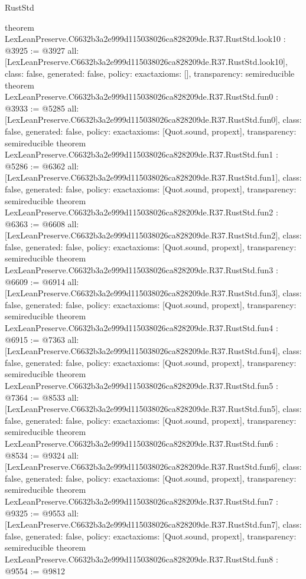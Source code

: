 \begin{lexlean}{RustStd}
\begin{coremodule}
{}
theorem LexLeanPreserve.C6632b3a2e999d115038026ca828209de.R37.RustStd.look10 : @3925 := @3927 {
  all: [LexLeanPreserve.C6632b3a2e999d115038026ca828209de.R37.RustStd.look10],
  class: false,
  generated: false,
  policy: exact{axioms: []},
  transparency: semireducible
}
theorem LexLeanPreserve.C6632b3a2e999d115038026ca828209de.R37.RustStd.fun0 : @3933 := @5285 {
  all: [LexLeanPreserve.C6632b3a2e999d115038026ca828209de.R37.RustStd.fun0],
  class: false,
  generated: false,
  policy: exact{axioms: [Quot.sound, propext]},
  transparency: semireducible
}
theorem LexLeanPreserve.C6632b3a2e999d115038026ca828209de.R37.RustStd.fun1 : @5286 := @6362 {
  all: [LexLeanPreserve.C6632b3a2e999d115038026ca828209de.R37.RustStd.fun1],
  class: false,
  generated: false,
  policy: exact{axioms: [Quot.sound, propext]},
  transparency: semireducible
}
theorem LexLeanPreserve.C6632b3a2e999d115038026ca828209de.R37.RustStd.fun2 : @6363 := @6608 {
  all: [LexLeanPreserve.C6632b3a2e999d115038026ca828209de.R37.RustStd.fun2],
  class: false,
  generated: false,
  policy: exact{axioms: [Quot.sound, propext]},
  transparency: semireducible
}
theorem LexLeanPreserve.C6632b3a2e999d115038026ca828209de.R37.RustStd.fun3 : @6609 := @6914 {
  all: [LexLeanPreserve.C6632b3a2e999d115038026ca828209de.R37.RustStd.fun3],
  class: false,
  generated: false,
  policy: exact{axioms: [Quot.sound, propext]},
  transparency: semireducible
}
theorem LexLeanPreserve.C6632b3a2e999d115038026ca828209de.R37.RustStd.fun4 : @6915 := @7363 {
  all: [LexLeanPreserve.C6632b3a2e999d115038026ca828209de.R37.RustStd.fun4],
  class: false,
  generated: false,
  policy: exact{axioms: [Quot.sound, propext]},
  transparency: semireducible
}
theorem LexLeanPreserve.C6632b3a2e999d115038026ca828209de.R37.RustStd.fun5 : @7364 := @8533 {
  all: [LexLeanPreserve.C6632b3a2e999d115038026ca828209de.R37.RustStd.fun5],
  class: false,
  generated: false,
  policy: exact{axioms: [Quot.sound, propext]},
  transparency: semireducible
}
theorem LexLeanPreserve.C6632b3a2e999d115038026ca828209de.R37.RustStd.fun6 : @8534 := @9324 {
  all: [LexLeanPreserve.C6632b3a2e999d115038026ca828209de.R37.RustStd.fun6],
  class: false,
  generated: false,
  policy: exact{axioms: [Quot.sound, propext]},
  transparency: semireducible
}
theorem LexLeanPreserve.C6632b3a2e999d115038026ca828209de.R37.RustStd.fun7 : @9325 := @9553 {
  all: [LexLeanPreserve.C6632b3a2e999d115038026ca828209de.R37.RustStd.fun7],
  class: false,
  generated: false,
  policy: exact{axioms: [Quot.sound, propext]},
  transparency: semireducible
}
theorem LexLeanPreserve.C6632b3a2e999d115038026ca828209de.R37.RustStd.fun8 : @9554 := @9812 {
}
\end{coremodule}
\end{lexlean}
